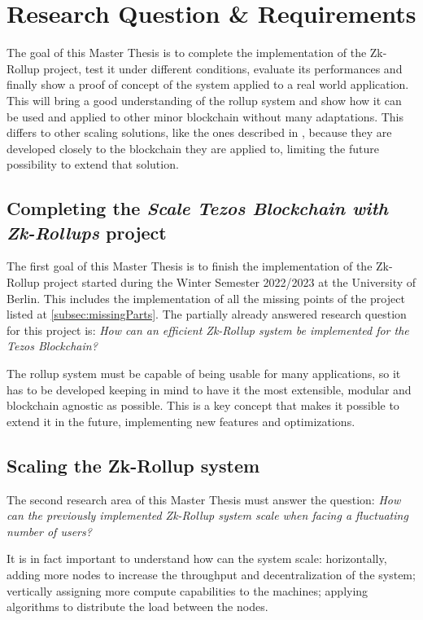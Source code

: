 \chapter{Research Question \& Requirements\label{cha:chapter3}}
The goal of this Master Thesis is to complete the implementation of the Zk-Rollup project, test it under different conditions, evaluate its performances and finally show a proof of concept of the system applied to a real world application. This will bring a good understanding of the rollup system and show how it can be used and applied to other minor blockchain without many adaptations. This differs to other scaling solutions, like the ones described in \cite{yang_review_2020}, because they are developed closely to the blockchain they are applied to, limiting the future possibility to extend that solution.

\section{Completing the \textit{Scale Tezos Blockchain with Zk-Rollups} project}
The first goal of this Master Thesis is to finish the implementation of the Zk-Rollup project started during the Winter Semester 2022/2023 at the University of Berlin. This includes the implementation of all the missing points of the project listed at \ref{subsec:missingParts}. The partially already answered research question for this project is: \textit{How can an efficient Zk-Rollup system be implemented for the Tezos Blockchain?}

The rollup system must be capable of being usable for many applications, so it has to be developed keeping in mind to have it the most extensible, modular and blockchain agnostic as possible. This is a key concept that makes it possible to extend it in the future, implementing new features and optimizations.

\section{Scaling the Zk-Rollup system}
The second research area of this Master Thesis must answer the question: \textit{How can the previously implemented  Zk-Rollup system scale when facing a fluctuating number of users?}

It is in fact important to understand how can the system scale: horizontally, adding more nodes to increase the throughput and decentralization of the system; vertically assigning more compute capabilities to the machines; applying algorithms to distribute the load between the nodes.

